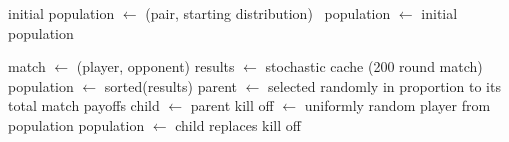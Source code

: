 \documentclass{article}
\begin{document}
  \begin{algorithmic}[1]
  \STATE initial population $\gets$ (pair, starting distribution) \
  \STATE population $\gets$ initial population

        \STATE match $\gets$ (player, opponent) 
        \STATE results $\gets$ stochastic cache (200 round match)
        \ENDFOR
      \ENDFOR
      \STATE population $\gets$ sorted(results)
      \STATE parent $\gets$ selected randomly in proportion to its total match payoffs
      \STATE child $\gets$ parent
      \STATE kill off $\gets$ uniformly random player from population
      \STATE population $\gets$ child replaces kill off
    \ENDWHILE
  \end{algorithmic}
\end{document}
